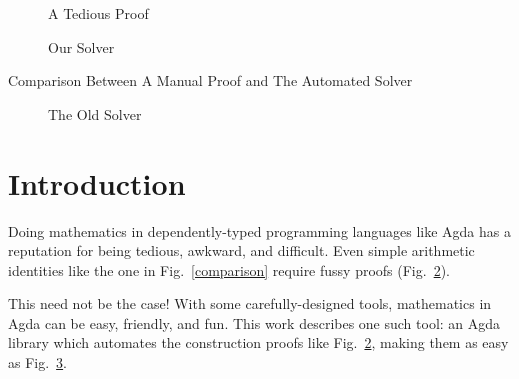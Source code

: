 \documentclass[acmsmall,review,anonymous]{acmart}\settopmatter{printfolios=true,printccs=false,printacmref=false}
\begin{document}
\begin{teaserfigure}
  \centering
  \begin{subfigure}[b]{\textwidth}
    \centering
    \label{ring-lemma}
  \end{subfigure}
  \begin{subfigure}[b]{.5\textwidth}
    \caption{A Tedious Proof}
    \label{ring-proof}
  \end{subfigure}%
  \begin{subfigure}[b]{.3\textwidth}
    \centering
    \caption{Our Solver}
    \label{the-solver}
  \end{subfigure}
  \caption{Comparison Between A Manual Proof and The Automated Solver}
  \label{comparison}
\end{teaserfigure}

\maketitle

\begin{figure}
  \caption{The Old Solver}
  \label{old-solver}
\end{figure}
\section{Introduction}
Doing mathematics in dependently-typed programming languages like Agda has a
reputation for being tedious, awkward, and difficult. Even simple arithmetic
identities like the one in Fig.~\ref{comparison} require fussy proofs
(Fig.~\ref{ring-proof}).

This need not be the case! With some carefully-designed tools, mathematics in
Agda can be easy, friendly, and fun. This work describes one such tool: an
Agda library which automates the construction proofs like Fig.~\ref{ring-proof},
making them as easy as Fig.~\ref{the-solver}.
\end{document}
